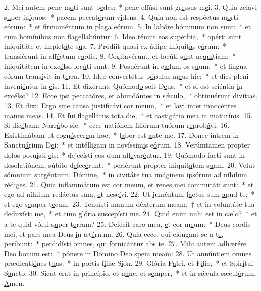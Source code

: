 2. Mei autem pene m\uline{o}ti sunt p\uline{e}des:~* pene effúsi sunt gr\uline{e}ssus m\uline{e}i.
3. Quia zelávi s\uline{u}per in\uline{í}quos,~* pacem peccat\uline{ó}rum v\uline{i}dens.
4. Quia non est respéctus m\uline{o}rti e\uline{ó}rum:~* et firmaméntum in pl\uline{a}ga e\uline{ó}rum.
5. In labóre h\uline{ó}minum n\uline{o}n sunt:~* et cum homínibus non flag\uline{e}llab\uline{ú}ntur:
6. Ideo ténuit \uline{e}os sup\uline{é}rbia,~* opérti sunt iniquitáte et impiet\uline{á}te s\uline{u}a.
7. Pródiit quasi ex ádipe iníquit\uline{a}s e\uline{ó}rum:~* transiérunt in aff\uline{é}ctum c\uline{o}rdis.
8. Cogitavérunt, et locúti s\uline{u}nt ne\uline{quí}tiam:~* iniquitátem in exc\uline{é}lso loc\uline{ú}ti sunt.
9. Posuérunt in c\uline{æ}lum os s\uline{u}um:~* et lingua eórum trans\uline{í}vit in t\uline{e}rra.
10. Ideo convertétur p\uline{ó}pulus m\uline{e}us hic:~* et dies pleni inveni\uline{é}ntur in \uline{e}is.
11. Et dixérunt: Quómod\uline{o} scit D\uline{e}us,~* et si est sciéntia \uline{i}n exc\uline{é}lso?
12. Ecce ipsi peccatóres, et abund\uline{á}ntes in s\uline{ǽ}culo,~* obtinu\uline{é}runt div\uline{í}tias.
13. Et dixi: Ergo sine causa justific\uline{á}vi cor m\uline{e}um,~* et lavi inter innocéntes m\uline{a}nus m\uline{e}as.
14. Et fui flagellátus t\uline{o}ta d\uline{i}e,~* et castigátio mea in m\uline{a}tut\uline{í}nis.
15. Si dic\uline{é}bam: Narr\uline{á}bo sic:~* ecce natiónem filiórum tuórum r\uline{e}prob\uline{á}vi.
16. Existimábam ut cogn\uline{ó}scer\uline{e}m hoc,~* l\uline{a}bor est \uline{a}nte me.
17. Donec intrem in Sanctu\uline{á}rium D\uline{e}i:~* et intélligam in novíssim\uline{i}s e\uline{ó}rum.
18. Verúmtamen propter dolos posu\uline{í}sti \uline{e}is:~* dejecísti eos dum all\uline{e}var\uline{é}ntur.
19. Quómodo facti sunt in desolatiónem, súbito d\uline{e}fec\uline{é}runt:~* periérunt propter iniquit\uline{á}tem s\uline{u}am.
20. Velut sómnium surg\uline{é}ntium, D\uline{ó}mine,~* in civitáte tua imáginem ipsórum ad n\uline{í}hilum r\uline{é}diges.
21. Quia inflammátum est cor meum, et renes mei c\uline{o}mmut\uline{á}ti sunt:~* et ego ad níhilum redáctus sum, \uline{e}t nesc\uline{í}vi.
22. Ut juméntum f\uline{a}ctus sum \uline{a}pud te:~* et ego s\uline{e}mper t\uline{e}cum.
23. Tenuísti manum déxteram meam:~† et in voluntáte tua d\uline{e}dux\uline{í}sti me,~* et cum glória s\uline{u}scep\uline{í}sti me.
24. Quid enim mihi \uline{e}st in c\uline{æ}lo?~* et a te quid vólui s\uline{u}per t\uline{e}rram?
25. Defécit caro mea, \uline{e}t cor m\uline{e}um:~* Deus cordis mei, et pars mea Deus \uline{i}n æt\uline{é}rnum.
26. Quia ecce, qui elóngant se a t\uline{e}, per\uline{í}bunt:~* perdidísti omnes, qui fornic\uline{á}ntur \uline{a}bs te.
27. Mihi autem adhærére D\uline{e}o b\uline{o}num est:~* pónere in Dómino D\uline{e}o spem m\uline{e}am:
28. Ut annúntiem omnes prædicati\uline{ó}nes t\uline{u}as,~* in portis f\uline{í}liæ S\uline{i}on.
29. Glória P\uline{a}tri, et F\uline{í}lio,~* et Spir\uline{í}tui S\uline{a}ncto.
30. Sicut erat in princípio, et n\uline{u}nc, et s\uline{e}mper,~* et in sǽcula sæcul\uline{ó}rum. \uline{A}men.
